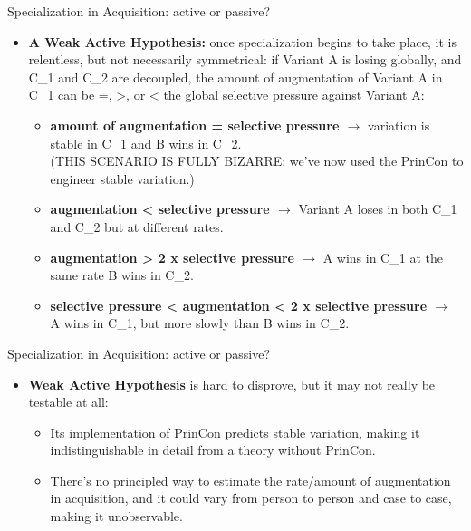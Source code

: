 \documentclass[hyperref={pdfpagelabels=false}]{beamer}
\begin{document}
\begin{frame}{Specialization in Acquisition: active or passive?}
		\begin{itemize}
			\item \textbf{A Weak Active Hypothesis:} once specialization begins to take place, it is relentless, but not necessarily symmetrical: if Variant A is losing globally, and C_1 and C_2 are decoupled, the amount of augmentation of Variant A in C_1 can be =, >, or < the global selective pressure against Variant A:			
			\begin{itemize}
					\item \textbf{amount of augmentation = selective pressure $\rightarrow$} variation is stable in C_1 and B wins in C_2.\\(THIS SCENARIO IS FULLY BIZARRE: we've now used the PrinCon to engineer stable variation.)
					\item \textbf{augmentation < selective pressure $\rightarrow$} Variant A loses in both C_1 and C_2 but at different rates.
					\item \textbf{augmentation > 2 x selective pressure $\rightarrow$} A wins in C_1 at the same rate B wins in C_2.
					\item \textbf{selective pressure < augmentation < 2 x selective pressure $\rightarrow$} A wins in C_1, but more slowly than B wins in C_2.			
			\end{itemize}
		\end{itemize}
\end{frame}

\begin{frame}{Specialization in Acquisition: active or passive?}
		\begin{itemize}
			\item \textbf{Weak Active Hypothesis} is hard to disprove, but it may not really be testable at all:
			\begin{itemize}
				\item Its implementation of PrinCon predicts stable variation, making it indistinguishable in detail from a theory without PrinCon.
				\item There's no principled way to estimate the rate/amount of augmentation in acquisition, and it could vary from person to person and case to case, making it unobservable.
			\end{itemize}
	
		\end{itemize}
\end{frame}
\end{document}

